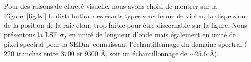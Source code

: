 \documentclass[../main/main.tex]{subfiles}
\begin{document}

Pour des raisons de clareté visuelle, nous avons choisi de montrer sur
la Figure~\ref{fig:lsf} la distribution des écarts types sous forme de
violon, la dispersion de la position de la raie étant trop faible pour
être discernable sur la figure. Nous présentons la LSF
$\sigma_{\lambda}$ en unité de longueur d'onde mais également en unité
de pixel spectral pour la SEDm,
connaissant l'échantillonnage du domaine spectral ($220$ tranches entre
$3700$ et $9300$ \AA, soit un échantillonnage de $\sim25.6$ \AA).
\end{document}
